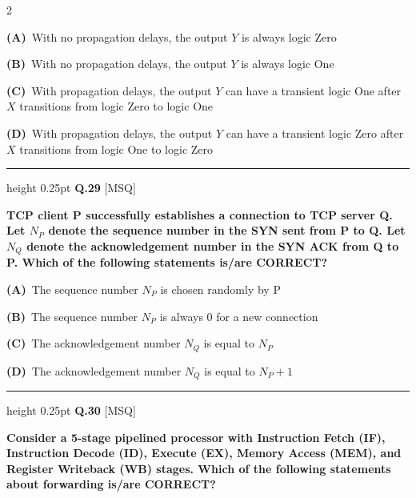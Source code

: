 \documentclass[a4paper,10pt,twoside]{article}
\begin{document}
\begin{multicols}{2}
\par\vspace{2pt}\noindent
\textbf{(A)}~With no propagation delays, the output $Y$ is always logic Zero\par\vspace{2pt}\noindent
\textbf{(B)}~With no propagation delays, the output $Y$ is always logic One\par\vspace{2pt}\noindent
\textbf{(C)}~With propagation delays, the output $Y$ can have a transient logic One after $X$ transitions from logic Zero to logic One\par\vspace{2pt}\noindent
\textbf{(D)}~With propagation delays, the output $Y$ can have a transient logic Zero after $X$ transitions from logic One to logic Zero
\par\vspace{6pt}\hrule height 0.25pt\vspace{6pt}
\noindent\textbf{Q.29} \hfill {\footnotesize\textsf{[MSQ]}}
\par\vspace{2pt}
{\bfseries TCP client P successfully establishes a connection to TCP server Q. Let $N_P$ denote the sequence number in the SYN sent from P to Q. Let $N_Q$ denote the acknowledgement number in the SYN ACK from Q to P. Which of the following statements is/are CORRECT? \par}
\par\vspace{2pt}\noindent
\textbf{(A)}~The sequence number $N_P$ is chosen randomly by P\par\vspace{2pt}\noindent
\textbf{(B)}~The sequence number $N_P$ is always 0 for a new connection\par\vspace{2pt}\noindent
\textbf{(C)}~The acknowledgement number $N_Q$ is equal to $N_P$\par\vspace{2pt}\noindent
\textbf{(D)}~The acknowledgement number $N_Q$ is equal to $N_P + 1$
\par\vspace{6pt}\hrule height 0.25pt\vspace{6pt}
\noindent\textbf{Q.30} \hfill {\footnotesize\textsf{[MSQ]}}
\par\vspace{2pt}
{\bfseries Consider a 5-stage pipelined processor with Instruction Fetch (IF), Instruction Decode (ID), Execute (EX), Memory Access (MEM), and Register Writeback (WB) stages. Which of the following statements about forwarding is/are CORRECT? \par}

\end{multicols}
\end{document}
